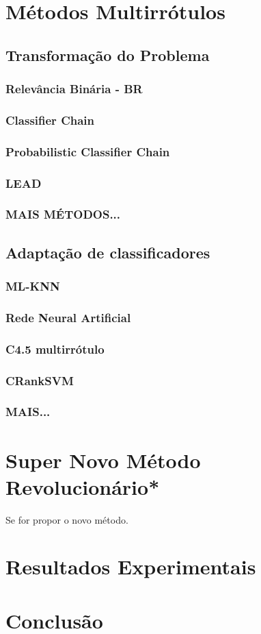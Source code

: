 \chapter{Métodos Multirrótulos}
\section{Transformação do Problema}
\subsection{Relevância Binária - BR}
\subsection{Classifier Chain}
\subsection{Probabilistic Classifier Chain}
\subsection{LEAD}
\subsection{MAIS MÉTODOS...}

\section{Adaptação de classificadores}
\subsection{ML-KNN}
\subsection{Rede Neural Artificial}
\subsection{C4.5 multirrótulo}
\subsection{CRankSVM}
\subsection{MAIS...}


\chapter{Super Novo Método Revolucionário*}
Se for propor o novo método.

\chapter{Resultados Experimentais}
\chapter{Conclusão}